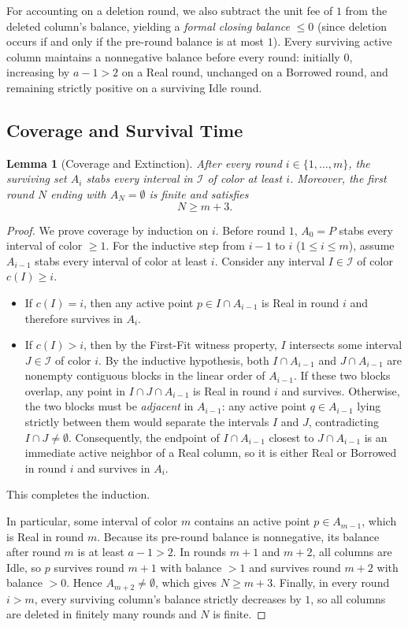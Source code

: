 \documentclass[11pt,a4paper]{article}
\newtheorem{lemma}[theorem]{Lemma}
\theoremstyle{remark}
\begin{document}
For accounting on a deletion round, we also subtract the unit fee of $1$ from the deleted column's balance, yielding a \emph{formal closing balance} $\le 0$ (since deletion occurs if and only if the pre-round balance is at most $1$). Every surviving active column maintains a nonnegative balance before every round: initially $0$, increasing by $a - 1 > 2$ on a Real round, unchanged on a Borrowed round, and remaining strictly positive on a surviving Idle round.

\subsection{Coverage and Survival Time}

\begin{lemma}[Coverage and Extinction]\label{lem:coverage}
After every round $i \in \{1, \dots, m\}$, the surviving set $A_i$ stabs every interval in $\mathcal{I}$ of color at least $i$. Moreover, the first round $N$ ending with $A_N = \emptyset$ is finite and satisfies
\[
  N \ge m + 3.
\]
\end{lemma}

\begin{proof}
We prove coverage by induction on $i$. Before round $1$, $A_0 = P$ stabs every interval of color $\ge 1$. For the inductive step from $i - 1$ to $i$ ($1 \le i \le m$), assume $A_{i-1}$ stabs every interval of color at least $i$. Consider any interval $I \in \mathcal{I}$ of color $c(I) \ge i$.
\begin{itemize}
  \item If $c(I) = i$, then any active point $p \in I \cap A_{i-1}$ is Real in round $i$ and therefore survives in $A_i$.
  \item If $c(I) > i$, then by the First-Fit witness property, $I$ intersects some interval $J \in \mathcal{I}$ of color $i$. By the inductive hypothesis, both $I \cap A_{i-1}$ and $J \cap A_{i-1}$ are nonempty contiguous blocks in the linear order of $A_{i-1}$. If these two blocks overlap, any point in $I \cap J \cap A_{i-1}$ is Real in round $i$ and survives. Otherwise, the two blocks must be \emph{adjacent} in $A_{i-1}$: any active point $q \in A_{i-1}$ lying strictly between them would separate the intervals $I$ and $J$, contradicting $I \cap J \ne \emptyset$. Consequently, the endpoint of $I \cap A_{i-1}$ closest to $J \cap A_{i-1}$ is an immediate active neighbor of a Real column, so it is either Real or Borrowed in round $i$ and survives in $A_i$.
\end{itemize}
This completes the induction.

In particular, some interval of color $m$ contains an active point $p \in A_{m-1}$, which is Real in round $m$. Because its pre-round balance is nonnegative, its balance after round $m$ is at least $a - 1 > 2$. In rounds $m + 1$ and $m + 2$, all columns are Idle, so $p$ survives round $m + 1$ with balance $> 1$ and survives round $m + 2$ with balance $> 0$. Hence $A_{m+2} \ne \emptyset$, which gives $N \ge m + 3$. Finally, in every round $i > m$, every surviving column's balance strictly decreases by $1$, so all columns are deleted in finitely many rounds and $N$ is finite.
\end{proof}
\end{document}
